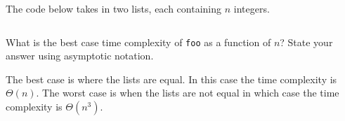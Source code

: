
\begin{prob}

    The code below takes in two lists, each containing $n$ integers.

    \inputminted{python}{code.py}

    What is the best case time complexity of \texttt{foo} as a function of $n$?
    State your answer using asymptotic notation.


    \begin{soln}
        The best case is where the lists are equal. In this case the time
        complexity is $\Theta(n)$. The worst case is when the lists are not
        equal in which case the time complexity is $\Theta(n^3)$.
    \end{soln}


\end{prob}
